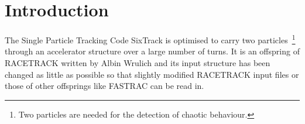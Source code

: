 \documentclass[a4paper,11pt]{report}
\begin{document}
\tableofcontents
\listoftables
{}

\chapter{Introduction}

The Single Particle Tracking Code SixTrack is optimised to carry two
particles~\footnote{Two particles are needed for the detection of
  chaotic behaviour.}  through an accelerator structure over a large
number of turns. It is an offspring of RACETRACK \cite{RACETRACK}
written by Albin Wrulich and its input structure has been changed as
little as possible so that slightly modified RACETRACK input files or
those of other offsprings like FASTRAC \cite{FASTRAC} can be read in.
\end{document}
